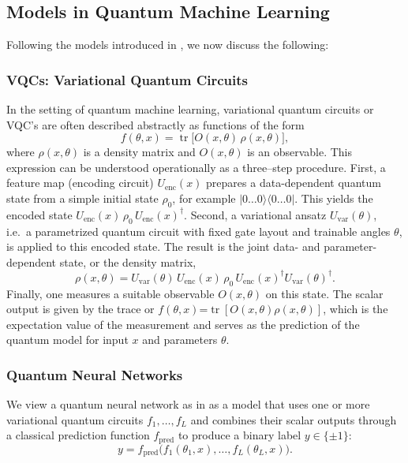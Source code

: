 \documentclass[12pt,a4paper,openany]{report}
\let\parencite\citep
\begin{document}
\subsection{Models in Quantum Machine Learning}
Following the models introduced in \parencite{bowles2024better}, we now discuss the following:
\subsubsection{VQCs: Variational Quantum Circuits}

In the setting of quantum machine learning, variational quantum circuits or VQC's are often
described abstractly as functions of the form
\[
    f(\theta, x) = \operatorname{tr}\!\big[ O(x,\theta)\,\rho(x,\theta) \big],
\]
where \(\rho(x,\theta)\) is a density matrix and \(O(x,\theta)\) is an observable.
This expression can be understood operationally as a three–step procedure.
First, a feature map (encoding circuit) \(U_{\mathrm{enc}}(x)\) prepares a
data-dependent quantum state from a simple initial state \(\rho_0\), for example
\(|0\ldots 0\rangle\langle 0\ldots 0|\). This yields the encoded state
\(U_{\mathrm{enc}}(x)\,\rho_0\,U_{\mathrm{enc}}(x)^{\dagger}\).
Second, a variational ansatz \(U_{\mathrm{var}}(\theta)\), i.e.\ a parametrized
quantum circuit with fixed gate layout and trainable angles \(\theta\), is applied
to this encoded state. The result is the joint data- and parameter-dependent state, or the density matrix,
\[
    \rho(x,\theta)
    = U_{\mathrm{var}}(\theta)\,U_{\mathrm{enc}}(x)\,\rho_0\,
      U_{\mathrm{enc}}(x)^{\dagger}U_{\mathrm{var}}(\theta)^{\dagger}.
\]
Finally, one measures a suitable observable \(O(x,\theta)\) on this state.
The scalar output is given by the trace or  \(f(\theta,x)\)=\(\operatorname{tr}[O(x,\theta)\rho(x,\theta)]\),
which is the expectation value of the measurement and serves as the prediction of
the quantum model for input \(x\) and parameters \(\theta\).

\subsubsection{Quantum Neural Networks}

We view a quantum neural network as in \parencite{bowles2024better} as a model that uses one or more
variational quantum circuits \(f_1,\dots,f_L\) and combines their scalar outputs
through a classical prediction function \(f_{\mathrm{pred}}\) to produce a binary
label \(y \in \{\pm 1\}\):
\[
    y = f_{\mathrm{pred}}\bigl(f_1(\theta_1,x),\dots,f_L(\theta_L,x)\bigr).
\]
\end{document}
